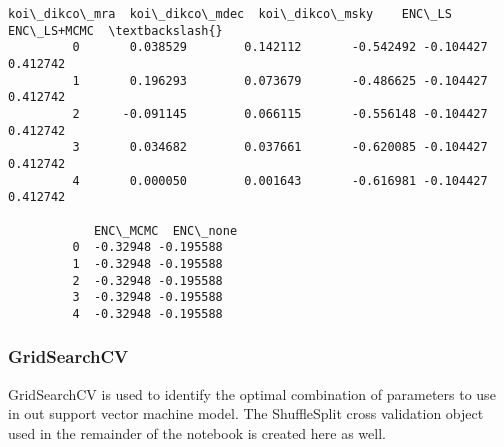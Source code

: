 \documentclass[11pt]{article}
\begin{document}
\begin{Verbatim}[commandchars=\\\{\}]
            koi\_dikco\_mra  koi\_dikco\_mdec  koi\_dikco\_msky    ENC\_LS  ENC\_LS+MCMC  \textbackslash{}
         0       0.038529        0.142112       -0.542492 -0.104427     0.412742   
         1       0.196293        0.073679       -0.486625 -0.104427     0.412742   
         2      -0.091145        0.066115       -0.556148 -0.104427     0.412742   
         3       0.034682        0.037661       -0.620085 -0.104427     0.412742   
         4       0.000050        0.001643       -0.616981 -0.104427     0.412742   
         
            ENC\_MCMC  ENC\_none  
         0  -0.32948 -0.195588  
         1  -0.32948 -0.195588  
         2  -0.32948 -0.195588  
         3  -0.32948 -0.195588  
         4  -0.32948 -0.195588  
\end{Verbatim}
            
    \subsubsection{GridSearchCV}\label{gridsearchcv}

GridSearchCV is used to identify the optimal combination of parameters
to use in out support vector machine model. The ShuffleSplit cross
validation object used in the remainder of the notebook is created here
as well.
\end{document}
